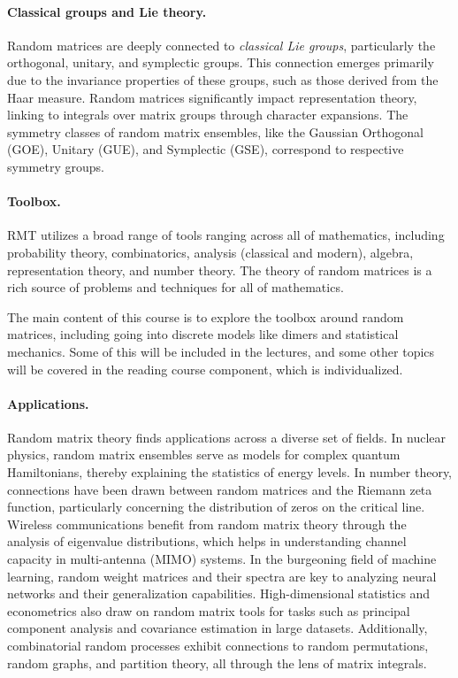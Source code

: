 \documentclass[letterpaper,11pt,oneside,reqno]{book}
\numberwithin{equation}{chapter}  %
\theoremstyle{definition}
\begin{document}
\paragraph{Classical groups and Lie theory.}
Random matrices are deeply connected to \emph{classical Lie groups}, particularly the orthogonal, unitary, and symplectic groups. This connection emerges primarily due to the invariance properties of these groups, such as those derived from the Haar measure.
Random matrices significantly impact representation theory, linking to integrals over matrix groups through character expansions. The symmetry classes of random matrix ensembles, like the Gaussian Orthogonal (GOE), Unitary (GUE), and Symplectic (GSE), correspond to respective symmetry groups.

\paragraph{Toolbox.}
RMT utilizes a broad range of tools ranging across all of mathematics, including probability theory, combinatorics, analysis (classical and modern), algebra, representation theory, and number theory.
The theory of random matrices is a rich source of problems and techniques for all of mathematics.

The main content of this course is to explore the toolbox
around random matrices, including going into discrete models
like dimers and statistical mechanics. Some of this will be included
in the lectures, and some other topics will be covered in the
reading course component, which is individualized.

\paragraph{Applications.}
Random matrix theory finds applications across a diverse set
of fields. In nuclear physics, random matrix ensembles serve
as models for complex quantum Hamiltonians, thereby
explaining the statistics of energy levels. In number
theory, connections have been drawn between random matrices
and the Riemann zeta function, particularly concerning the
distribution of zeros on the critical line. Wireless
communications benefit from random matrix theory through the
analysis of eigenvalue distributions, which helps in
understanding channel capacity in multi-antenna (MIMO) systems. In the burgeoning field of
machine learning, random weight matrices and their spectra
are key to analyzing neural networks and their
generalization capabilities. High-dimensional statistics
and econometrics
also draw on random matrix tools for tasks such as principal
component analysis and covariance estimation in large
datasets. Additionally, combinatorial random processes
exhibit connections to random permutations, random graphs,
and partition theory, all through the lens of matrix
integrals.
\end{document}
